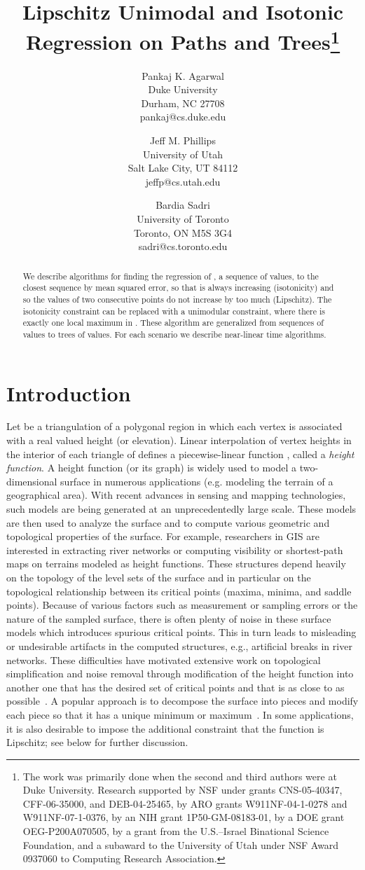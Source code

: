 \documentclass[11pt]{article}
\title{Lipschitz Unimodal and Isotonic Regression on Paths and Trees\footnote{The work was primarily done when the second and third authors were at Duke University. Research supported by NSF under grants
    CNS-05-40347, CFF-06-35000, and DEB-04-25465, by ARO grants
    W911NF-04-1-0278 and W911NF-07-1-0376, by an NIH grant
    1P50-GM-08183-01, by a DOE grant OEG-P200A070505, by a grant
    from the U.S.--Israel Binational Science Foundation, and a subaward to the University of Utah under NSF Award 0937060 to Computing Research Association.}}
\author{\begin{tabular}{c}
	Pankaj K. Agarwal\\
	\small Duke University\\
	\small Durham, NC 27708\\
	\small pankaj@cs.duke.edu
	\end{tabular}
	\and 
	\begin{tabular}{c}
	Jeff M. Phillips\\
	\small University of Utah\\
	\small Salt Lake City, UT 84112\\
	\small jeffp@cs.utah.edu
	\end{tabular}
	\and 
	\begin{tabular}{c}
	Bardia Sadri\\
	\small University of Toronto\\
	\small Toronto, ON M5S 3G4\\
	\small sadri@cs.toronto.edu
	\end{tabular}
}
\begin{document}
\begin{titlepage}
\maketitle
\thispagestyle{empty}
\begin{abstract}
We describe algorithms for finding the regression of , a sequence of values, to the closest sequence  by mean squared error, so that  is always increasing (isotonicity) and so the values of two consecutive points do not increase by too much (Lipschitz).  The isotonicity constraint can be replaced with a unimodular constraint, where there is exactly one local maximum in .  These algorithm are generalized from sequences of values to trees of values.  For each scenario we describe near-linear time algorithms.  
\end{abstract}
\end{titlepage}




\section{Introduction}\label{sec:intro}

Let  be a triangulation of a polygonal region  in which each vertex is 
associated with a real valued height (or elevation). Linear interpolation of vertex heights in the interior of 
each triangle of  defines a piecewise-linear
function , called a \emph{height function}. 
A height function (or its graph) is widely used to model a 
two-dimensional surface in numerous applications (e.g. modeling the 
terrain of a geographical area).  With recent advances in sensing
and mapping technologies, such models are being generated
at an unprecedentedly large scale. These models are then used to 
analyze the surface and to compute various geometric and 
topological properties of the surface. For example, researchers in GIS
are interested in extracting river networks or computing visibility 
or shortest-path maps on terrains modeled as height functions. These structures depend heavily on 
the topology of the level sets of the surface and in particular on the topological relationship between its critical 
points (maxima, minima, and saddle points). 
Because of various factors such as measurement or sampling errors or the nature of the sampled surface, 
there is often plenty of noise in these surface models which introduces spurious 
critical points. This in turn leads to misleading or 
undesirable artifacts in the computed structures, e.g.,
artificial breaks in river networks. These difficulties have motivated
extensive work on topological simplification and noise removal through modification of the height function  into another one 
 that has the desired set 
of critical points and that is as close to  as 
possible~\cite{Bremer:03,Ni:04,Soille:04,Soille:04a,vKS09}. A popular
approach is to decompose the surface into pieces and modify each
piece so that it has a unique minimum or maximum~\cite{Soille:03a}.  In some applications, it is also desirable to impose the additional constraint that the function  is Lipschitz; see below for further discussion. 
\end{document}

